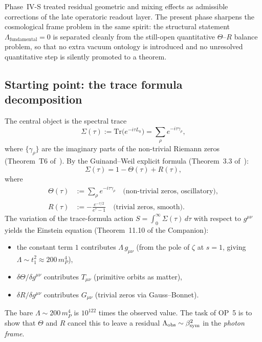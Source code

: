 \begin{remark}\label{rem:transition_s_to_t_closed}
Phase~IV-S treated residual geometric and mixing effects as admissible corrections of the late operatoric readout layer. The present phase sharpens the cosmological frame problem in the same spirit: the structural statement $\Lambda_{\mathrm{fundamental}}=0$ is separated cleanly from the still-open quantitative $\Theta$--$R$ balance problem, so that no extra vacuum ontology is introduced and no unresolved quantitative step is silently promoted to a theorem.
\end{remark}

\subsection{Starting point: the trace formula decomposition}

The central object is the spectral trace
\[
 \Sigma(\tau) := \mathrm{Tr}\!\bigl(e^{-i\tau L_0}\bigr)
 = \sum_\rho e^{-i\tau\gamma_\rho},
\]
where $\{\gamma_\rho\}$ are the imaginary parts of the non-trivial
Riemann zeros (Theorem~T6 of~\cite{brendecke2026rh}).
By the Guinand--Weil explicit formula (Theorem~3.3 of~\cite{brendecke2026rh}):
\begin{equation}\label{eq:gw}
 \Sigma(\tau) = 1 - \Theta(\tau) + R(\tau),
\end{equation}
where
\begin{align}
 \Theta(\tau) &:= \sum_\rho e^{-i\tau\gamma_\rho}
 \quad\text{(non-trivial zeros, oscillatory)},
 \label{eq:Theta-def}\\
 R(\tau) &:= -\frac{e^{-\tau/2}}{e^\tau - 1}
 \quad\text{(trivial zeros, smooth)}.
 \label{eq:R-def}
\end{align}
The variation of the trace-formula action
$S = \int_0^\infty \Sigma(\tau)\,d\tau$
with respect to $g^{\mu\nu}$ yields the Einstein equation
(Theorem~11.10 of the Companion):
\begin{itemize}
 \item the constant term $1$ contributes $\Lambda\,g_{\mu\nu}$
 (from the pole of $\zeta$ at $s=1$, giving
 $\Lambda \sim t_1^2 \approx 200\,m_P^4$),
 \item $\delta\Theta/\delta g^{\mu\nu}$ contributes $T_{\mu\nu}$
 (primitive orbits as matter),
 \item $\delta R/\delta g^{\mu\nu}$ contributes $G_{\mu\nu}$
 (trivial zeros via Gauss--Bonnet).
\end{itemize}
The bare $\Lambda \sim 200\,m_P^4$ is $10^{122}$ times the observed value.
The task of OP~5 is to show that $\Theta$ and $R$ cancel this to leave
a residual $\Lambda_{\mathrm{obs}} \sim \beta_{\mathrm{sym}}^2$ in the \emph{photon frame}.

